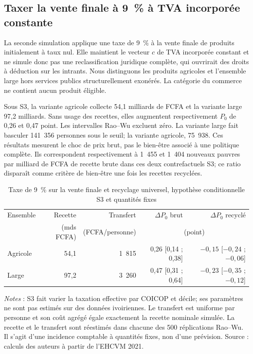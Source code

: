 \documentclass[11pt,a4paper]{article}
\begin{document}
\subsection{Taxer la vente finale à 9~\% à TVA incorporée constante}

La seconde simulation applique une taxe de 9~\% à la vente finale de produits
initialement à taux nul. Elle maintient le vecteur $c$ de TVA incorporée
constant et ne simule donc pas une reclassification juridique complète, qui
ouvrirait des droits à déduction sur les intrants. Nous distinguons les
produits agricoles et l'ensemble large hors services publics structurellement
exonérés. La catégorie du commerce ne contient aucun produit éligible.

Sous S3, la variante agricole collecte 54,1 milliards de FCFA et la variante
large 97,2 milliards. Sans usage des recettes, elles augmentent respectivement
$P_0$ de 0,26 et 0,47 point. Les intervalles Rao--Wu excluent zéro. La variante
large fait basculer 141~356 personnes sous le seuil; la variante agricole,
75~938. Ces résultats mesurent le choc de prix brut, pas le bien-être associé à
une politique complète. Ils correspondent respectivement à 1~455 et 1~404
nouveaux pauvres par milliard de FCFA de recette brute dans ces deux
contrefactuels S3; ce ratio disparaît comme critère de bien-être une fois les
recettes recyclées.

\begin{table}[t]
\centering
\begin{threeparttable}
\caption{Taxe de 9~\% sur la vente finale et recyclage universel, hypothèse
conditionnelle S3 et quantités fixes}
\label{tab:reforme}
\begin{tabular}{lrrrr}
\toprule
Ensemble & Recette & Transfert & $\Delta P_0$ brut & $\Delta P_0$ recyclé \\
         & (mds FCFA) & (FCFA/personne) & \multicolumn{2}{c}{(point)} \\
\midrule
Agricole & 54,1 & 1~815 & 0,26 [0,14 ; 0,38] & $-0,15$ [$-0,24$ ; $-0,06$] \\
Large    & 97,2 & 3~260 & 0,47 [0,31 ; 0,64] & $-0,23$ [$-0,35$ ; $-0,12$] \\
\bottomrule
\end{tabular}
\begin{tablenotes}\footnotesize
\item \emph{Notes} : S3 fait varier la taxation effective par COICOP et
décile; ses paramètres ne sont pas estimés sur des données ivoiriennes. Le
transfert est uniforme par personne et son coût agrégé égale
exactement la recette nominale simulée. La recette et le transfert sont
réestimés dans chacune des 500 réplications Rao--Wu. Il s'agit d'une incidence
comptable à quantités fixes, non d'une prévision. Source : calculs des auteurs à partir de l'EHCVM 2021.
\end{tablenotes}
\end{threeparttable}
\end{table}
\end{document}
